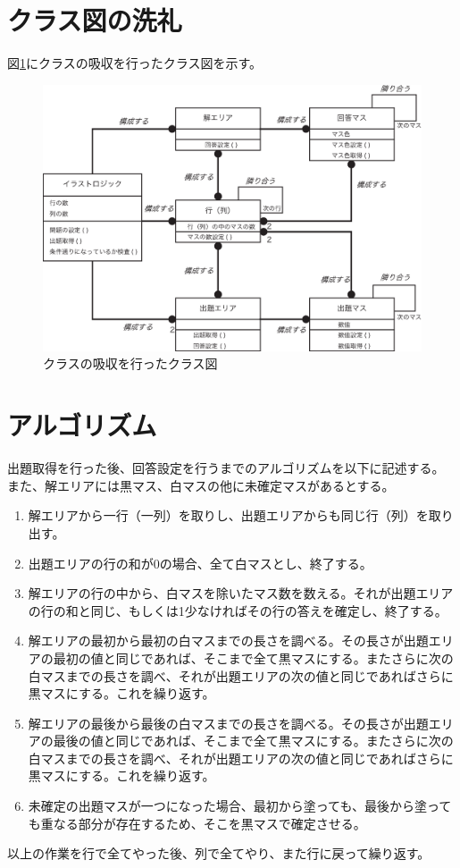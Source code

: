 \documentclass[a4j]{jarticle}
\begin{document}
\section{クラス図の洗礼}
図\ref{fig:class-absorption}にクラスの吸収を行ったクラス図を示す。

\begin{figure}[hp]
\centering
\includegraphics[width=15cm]{./image/class-absorption.eps}
\caption{クラスの吸収を行ったクラス図}
\label{fig:class-absorption}
\end{figure}

\section{アルゴリズム}
出題取得を行った後、回答設定を行うまでのアルゴリズムを以下に記述する。
また、解エリアには黒マス、白マスの他に未確定マスがあるとする。

\begin{enumerate}
 \item 解エリアから一行（一列）を取りし、出題エリアからも同じ行（列）を取り出す。
 \item 出題エリアの行の和が0の場合、全て白マスとし、終了する。
 \item 解エリアの行の中から、白マスを除いたマス数を数える。それが出題エリアの行の和と同じ、もしくは1少なければその行の答えを確定し、終了する。
 \item 解エリアの最初から最初の白マスまでの長さを調べる。その長さが出題エリアの最初の値と同じであれば、そこまで全て黒マスにする。またさらに次の白マスまでの長さを調べ、それが出題エリアの次の値と同じであればさらに黒マスにする。これを繰り返す。
 \item 解エリアの最後から最後の白マスまでの長さを調べる。その長さが出題エリアの最後の値と同じであれば、そこまで全て黒マスにする。またさらに次の白マスまでの長さを調べ、それが出題エリアの次の値と同じであればさらに黒マスにする。これを繰り返す。
 \item 未確定の出題マスが一つになった場合、最初から塗っても、最後から塗っても重なる部分が存在するため、そこを黒マスで確定させる。
\end{enumerate}
以上の作業を行で全てやった後、列で全てやり、また行に戻って繰り返す。
\end{document}
